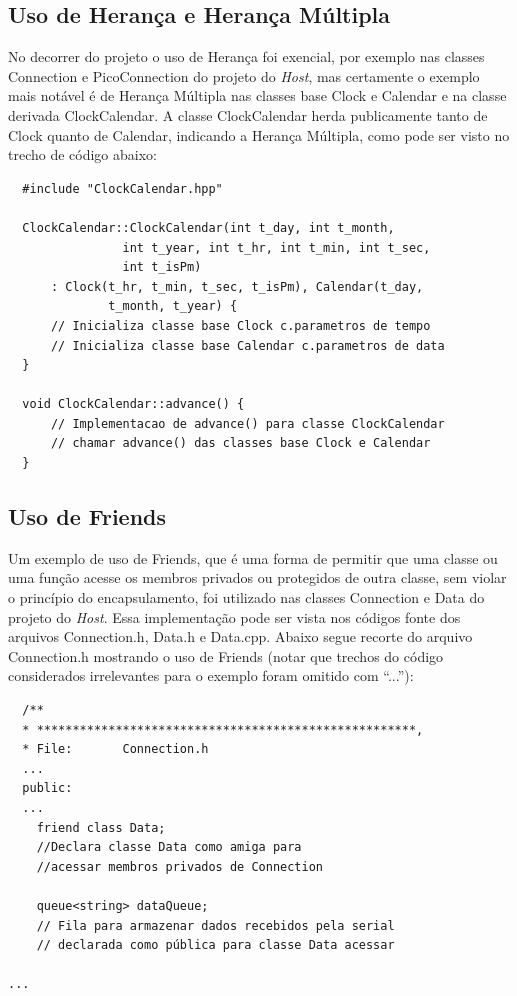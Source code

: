 \documentclass[10pt,twocolumn,letterpaper]{article}
\begin{document}
\subsection{Uso de Herança e Herança Múltipla}
No decorrer do projeto o uso de Herança foi exencial, por exemplo nas classes Connection e PicoConnection do projeto do \emph{Host}, mas certamente o exemplo mais notável é de Herança Múltipla nas classes base Clock e Calendar e na classe derivada ClockCalendar. A classe ClockCalendar herda publicamente tanto de Clock quanto de Calendar, indicando a Herança Múltipla, como pode ser visto no trecho de código abaixo: 
{\scriptsize
\begin{verbatim}
  #include "ClockCalendar.hpp"

  ClockCalendar::ClockCalendar(int t_day, int t_month, 
                int t_year, int t_hr, int t_min, int t_sec, 
                int t_isPm)
      : Clock(t_hr, t_min, t_sec, t_isPm), Calendar(t_day, 
              t_month, t_year) {
      // Inicializa classe base Clock c.parametros de tempo
      // Inicializa classe base Calendar c.parametros de data
  }
  
  void ClockCalendar::advance() {
      // Implementacao de advance() para classe ClockCalendar
      // chamar advance() das classes base Clock e Calendar
  }
\end{verbatim}
}

\subsection{Uso de Friends}
Um exemplo de uso de Friends, que é uma forma de permitir que uma classe ou uma função acesse os membros privados ou protegidos de outra classe, sem violar o princípio do encapsulamento, foi utilizado nas classes Connection e Data do projeto do \emph{Host}. 
Essa implementação pode ser vista nos códigos fonte dos arquivos Connection.h, Data.h e Data.cpp. Abaixo segue recorte do arquivo Connection.h mostrando o uso de Friends (notar que trechos do código considerados irrelevantes para o exemplo foram omitido com ``...''):
{\scriptsize
\begin{verbatim}
  /**
  * *****************************************************,
  * File:       Connection.h
  ...
  public:
  ...
    friend class Data;
    //Declara classe Data como amiga para
    //acessar membros privados de Connection
    
    queue<string> dataQueue; 
    // Fila para armazenar dados recebidos pela serial
    // declarada como pública para classe Data acessar

...  
\end{verbatim}
}
\end{document}
